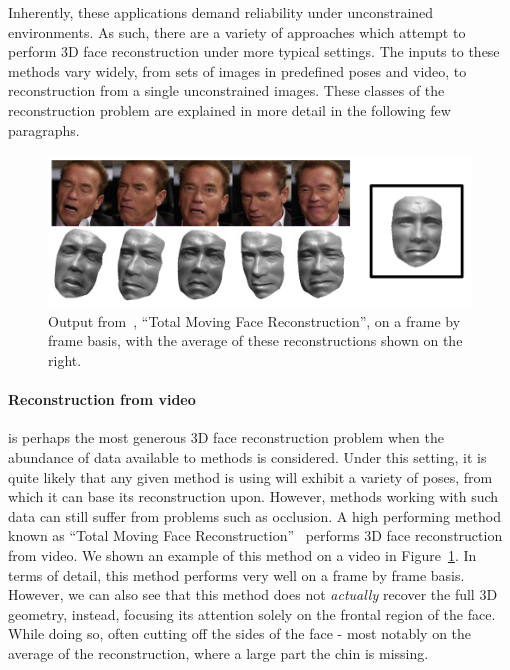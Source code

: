 Inherently, these applications demand reliability under unconstrained
environments. As such, there are a variety of approaches which attempt
to perform 3D face reconstruction under more typical settings. The
inputs to these methods vary widely, from sets of images in predefined
poses and video, to reconstruction from a single unconstrained
images. These classes of the reconstruction problem are explained in
more detail in the following few paragraphs.

\begin{figure}
  \centering
  \includegraphics[width=\linewidth]{img/total_moving.png}
  \caption[Example output from Total Moving Face Reconstruction
  method]{Output from~\cite{suwajanakorn2014total}, ``Total Moving
    Face Reconstruction'', on a frame by frame basis, with the average
    of these reconstructions shown on the right.}
  \label{fig:total_moving}
\end{figure}

\paragraph{Reconstruction from video} is perhaps the most generous 3D
face reconstruction problem when the abundance of data available to
methods is considered. Under this setting, it is quite likely that any
given method is using will exhibit a variety of poses, from which it
can base its reconstruction upon. However, methods working with such
data can still suffer from problems such as occlusion. A high
performing method known as ``Total Moving Face
Reconstruction''~\cite{suwajanakorn2014total} performs 3D face
reconstruction from video. We shown an example of this method on a
video in Figure~\ref{fig:total_moving}. In terms of detail, this
method performs very well on a frame by frame basis. However, we can
also see that this method does not \textit{actually} recover the full
3D geometry, instead, focusing its attention solely on the frontal
region of the face. While doing so, often cutting off the sides of the
face - most notably on the average of the reconstruction, where a
large part the chin is missing.


